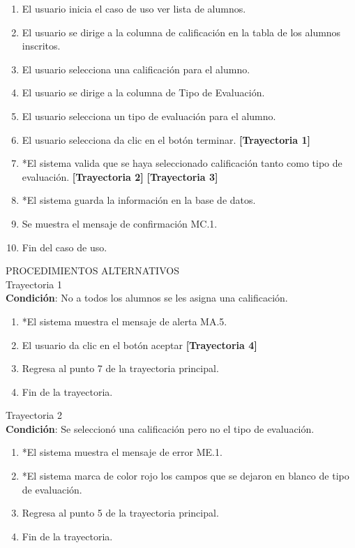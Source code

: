 \begin{enumerate}
\item El usuario inicia el caso de uso ver lista de alumnos.
\item El usuario se dirige a la columna de calificación en la tabla de los alumnos inscritos.
\item El usuario selecciona una calificación para el alumno.
\item El usuario se dirige a la columna de Tipo de Evaluación.
\item El usuario selecciona un tipo de evaluación para el alumno.
\item El usuario selecciona da clic en el botón terminar. \textbf{[Trayectoria 1]}
\item *El sistema valida que se haya seleccionado calificación tanto como tipo de evaluación. \textbf{[Trayectoria 2]} \textbf{[Trayectoria 3]}
\item *El sistema guarda la información en la base de datos.
\item Se muestra el mensaje de confirmación MC.1. 
\item Fin del caso de uso.
\end{enumerate}
\vspace*{1cm}
\Large{PROCEDIMIENTOS ALTERNATIVOS}\\
\large{Trayectoria 1}\\
\textbf{Condición}: No a todos los alumnos se les asigna una calificación.
\begin{enumerate}
\item *El sistema muestra el mensaje de alerta MA.5.
\item El usuario da clic en el botón aceptar \textbf{[Trayectoria 4]}
\item Regresa al punto 7 de la trayectoria principal.
\item Fin de la trayectoria.
\end{enumerate}
\large{Trayectoria 2}\\
\textbf{Condición}: Se seleccionó una calificación pero no el tipo de evaluación.
\begin{enumerate}
\item *El sistema muestra el mensaje de error ME.1.
\item *El sistema marca de color rojo los campos que se dejaron en blanco de tipo de evaluación.
\item Regresa al punto 5 de la trayectoria principal.
\item Fin de la trayectoria.
\end{enumerate}
